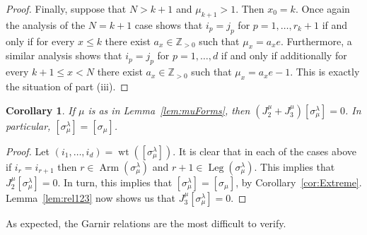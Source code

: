 \documentclass[twoside,11pt,reqno,letter]{amsart}
\numberwithin{equation}{section}
\newtheorem{Corollary}[equation]{Corollary}
\theoremstyle{definition}  %
\newcommand{\Arm}{\operatorname{Arm}}
\newcommand{\Leg}{\operatorname{Leg}}
\newcommand{\Z}{\mathbb{Z}}
\newcommand{\0}{{\bar 0}}
\newcommand{\1}{{\bar 1}}
\newcommand{\la}{\lambda}
\newcommand{\si}{\sigma}
\def\wt{{\operatorname{wt}}}
\begin{document}
{\begin{proof}
  Finally, suppose that $N > k+1$ and $\mu_{k+1} > 1$. Then $x_0 = k$. Once again the analysis of the $N = k+1$ case shows that $i_p = j_p$ for $p = 1, \dots, r_k+1$ if and only if for every $x \leq k$ there exist $a_x \in \Z_{>0}$ such that $\mu_x = a_x e$. Furthermore, a similar analysis shows that $i_p = j_p$ for $p = 1, \dots, d$ if and only if additionally for every $k+1 \leq x < N$ there exist $a_x \in \Z_{>0}$ such that $\mu_x = a_x e - 1$. This is exactly the situation of part (iii).
\end{proof}











\begin{Corollary}\label{cor:muForms}
  If $\mu$ is as in Lemma~\ref{lem:muForms}, then $(J_2^\mu + J_3^\mu)[\si^\la_\mu] = 0$. In particular, $[\si^\la_\mu] = [\si_{\mu}]$.
\end{Corollary}

\begin{proof}
  Let $(i_1, \dots, i_d) = \wt([\si^\la_\mu])$. It is clear that in each of the cases above if $i_r = i_{r+1}$ then $r \in \Arm(\si^\la_\mu)$ and $r+1 \in \Leg(\si^\la_\mu)$. This implies that $J^\mu_2[\si^\la_\mu] = 0$. In turn, this implies that $[\si^\la_\mu] = [\si_{\mu}]$, by Corollary~\ref{cor:Extreme}. Lemma~\ref{lem:rel123} now shows us that $J^\mu_3[\si^\la_\mu] = 0$.
\end{proof}










As expected, the Garnir relations are the most difficult to verify.





}
\end{document}
